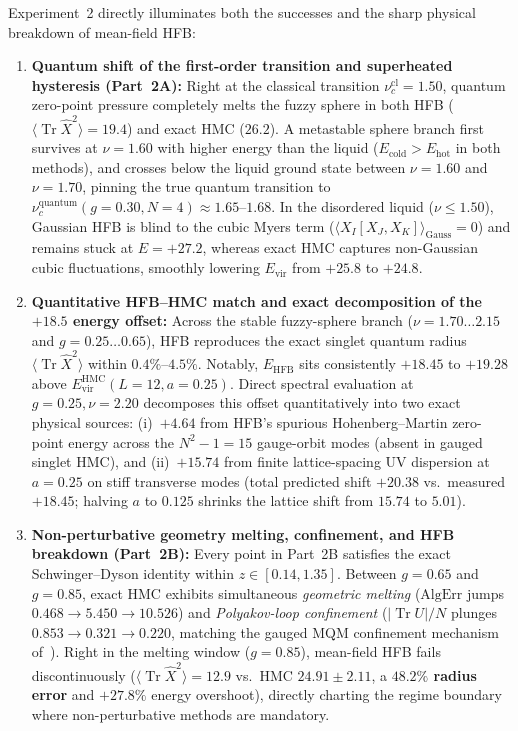 \documentclass[11pt,a4paper]{article}
\DeclareMathOperator{\Tr}{Tr}
\begin{document}
Experiment~2 directly illuminates both the successes and the sharp physical breakdown of mean-field HFB:
\begin{enumerate}
  \item \textbf{Quantum shift of the first-order transition and superheated hysteresis (Part~2A):} Right at the classical transition $\nu_c^{\mathrm{cl}} = 1.50$, quantum zero-point pressure completely melts the fuzzy sphere in both HFB ($\langle\Tr\hat{X}^2\rangle = 19.4$) and exact HMC ($26.2$). A metastable sphere branch first survives at $\nu = 1.60$ with higher energy than the liquid ($E_{\mathrm{cold}} > E_{\mathrm{hot}}$ in both methods), and crosses below the liquid ground state between $\nu = 1.60$ and $\nu = 1.70$, pinning the true quantum transition to $\nu_c^{\mathrm{quantum}}(g=0.30, N=4) \approx 1.65$--$1.68$. In the disordered liquid ($\nu \le 1.50$), Gaussian HFB is blind to the cubic Myers term ($\langle X_I[X_J,X_K]\rangle_{\mathrm{Gauss}} = 0$) and remains stuck at $E = +27.2$, whereas exact HMC captures non-Gaussian cubic fluctuations, smoothly lowering $E_{\mathrm{vir}}$ from $+25.8$ to $+24.8$.
  \item \textbf{Quantitative HFB--HMC match and exact decomposition of the $+18.5$ energy offset:} Across the stable fuzzy-sphere branch ($\nu=1.70\dots 2.15$ and $g=0.25\dots 0.65$), HFB reproduces the exact singlet quantum radius $\langle\Tr\hat{X}^2\rangle$ within $0.4\%$--$4.5\%$. Notably, $E_{\mathrm{HFB}}$ sits consistently $+18.45$ to $+19.28$ above $E_{\mathrm{vir}}^{\mathrm{HMC}}(L=12, a=0.25)$. Direct spectral evaluation at $g=0.25, \nu=2.20$ decomposes this offset quantitatively into two exact physical sources: (i)~$+4.64$ from HFB's spurious Hohenberg--Martin zero-point energy across the $N^2-1 = 15$ gauge-orbit modes (absent in gauged singlet HMC), and (ii)~$+15.74$ from finite lattice-spacing UV dispersion at $a=0.25$ on stiff transverse modes (total predicted shift $+20.38$ vs.\ measured $+18.45$; halving $a$ to $0.125$ shrinks the lattice shift from $15.74$ to $5.01$).
  \item \textbf{Non-perturbative geometry melting, confinement, and HFB breakdown (Part~2B):} Every point in Part~2B satisfies the exact Schwinger--Dyson identity within $z \in [0.14, 1.35]$. Between $g=0.65$ and $g=0.85$, exact HMC exhibits simultaneous \emph{geometric melting} ($\mathrm{AlgErr}$ jumps $0.468 \to 5.450 \to 10.526$) and \emph{Polyakov-loop confinement} ($|\Tr U|/N$ plunges $0.853 \to 0.321 \to 0.220$, matching the gauged MQM confinement mechanism of~\cite{Kawahara2007}). Right in the melting window ($g=0.85$), mean-field HFB fails discontinuously ($\langle\Tr\hat{X}^2\rangle = 12.9$ vs.\ HMC $24.91 \pm 2.11$, a \textbf{$48.2\%$ radius error} and $+27.8\%$ energy overshoot), directly charting the regime boundary where non-perturbative methods are mandatory.
\end{enumerate}
\end{document}
